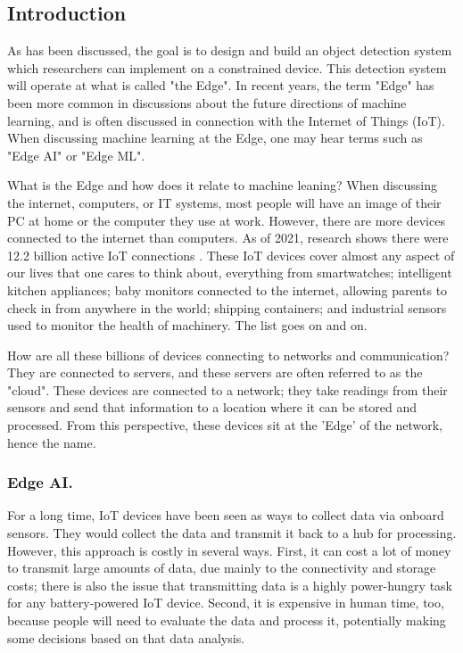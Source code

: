\documentclass{svproc}
\begin{document}
\subsection{Introduction}
As has been discussed, the goal is to design and build an object detection system which researchers can implement on a 
constrained device. This detection system will operate at what is called "the Edge". In recent years, the term "Edge" has 
been more common in discussions about the future directions of machine learning, and is often discussed in connection 
with the Internet of Things (IoT). When discussing machine learning at the Edge, one may hear terms such as "Edge AI" or "Edge ML".

What is the Edge and how does it relate to machine leaning? When discussing the internet, computers, or IT systems, 
most people will have an image of their PC at home or the computer they use at work. However, there are more devices 
connected to the internet than computers. As of 2021, research shows there were 12.2 billion active IoT connections \cite{b3}. 
These IoT devices cover almost any aspect of our lives that one cares to think about, everything from smartwatches; 
intelligent kitchen appliances; baby monitors connected to the internet, allowing parents to check in from anywhere in the world; 
shipping containers; and industrial sensors used to monitor the health of machinery. The list goes on and on.

How are all these billions of devices connecting to networks and communication? They are connected to servers, 
and these servers are often referred to as the "cloud". These devices are connected to a network; they take readings from their 
sensors and send that information to a location where it can be stored and processed. From this perspective, 
these devices sit at the 'Edge' of the network, hence the name.

\subsubsection{Edge AI.}
For a long time, IoT devices have been seen as ways to collect data via onboard sensors. They would collect the data and 
transmit it back to a hub for processing. However, this approach is costly in several ways. First, it can cost a lot of 
money to transmit large amounts of data, due mainly to the connectivity and storage costs; there is also the issue that transmitting 
data is a highly power-hungry task for any battery-powered IoT device. Second, it is expensive in human time, too, because 
people will need to evaluate the data and process it, potentially making some decisions based on that data analysis.
\end{document}
